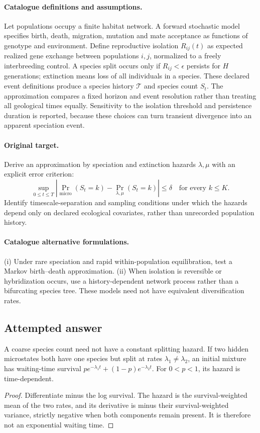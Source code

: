 \documentclass[11pt]{article}
\begin{document}
\paragraph{Catalogue definitions and assumptions.}
Let populations occupy a finite habitat network. A forward stochastic model specifies birth, death, migration, mutation and mate acceptance as functions of genotype and environment. Define reproductive isolation $R_{ij}(t)$ as expected realized gene exchange between populations $i,j$, normalized to a freely interbreeding control. A species split occurs only if $R_{ij}<\epsilon$ persists for $H$ generations; extinction means loss of all individuals in a species. These declared event definitions produce a species history $\mathcal T$ and species count $S_t$. The approximation compares a fixed horizon and event resolution rather than treating all geological times equally. Sensitivity to the isolation threshold and persistence duration is reported, because these choices can turn transient divergence into an apparent speciation event.
\paragraph{Original target.}
Derive an approximation by speciation and extinction hazards $\lambda,\mu$ with an explicit error criterion:
\[
 \sup_{0\le t\le T}
 \left|\Pr_{\mathrm{micro}}(S_t=k)-\Pr_{\lambda,\mu}(S_t=k)\right|
 \le\delta\quad\text{for every }k\le K.
\]
Identify timescale-separation and sampling conditions under which the hazards depend only on declared ecological covariates, rather than unrecorded population history.
\paragraph{Catalogue alternative formulations.}
(i) Under rare speciation and rapid within-population equilibration, test a Markov birth--death approximation. (ii) When isolation is reversible or hybridization occurs, use a history-dependent network process rather than a bifurcating species tree. These models need not have equivalent diversification rates.
\subsection{Attempted answer}
\begin{proposition}
A coarse species count need not have a constant splitting hazard. If two hidden microstates both have one species but split at rates $\lambda_1\ne\lambda_2$, an initial mixture has waiting-time survival $pe^{-\lambda_1t}+(1-p)e^{-\lambda_2t}$. For $0<p<1$, its hazard is time-dependent.
\end{proposition}
\begin{proof}
Differentiate minus the log survival. The hazard is the survival-weighted mean of the two rates, and its derivative is minus their survival-weighted variance, strictly negative when both components remain present. It is therefore not an exponential waiting time.
\end{proof}
\end{document}
